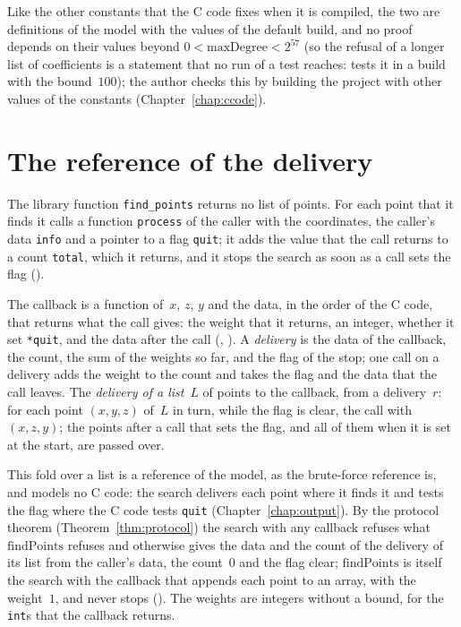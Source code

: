 Like the other constants that the C code fixes when it is compiled, the two are definitions of the
model with the values of the default build, and no proof depends on their values beyond
$0 < \mathrm{maxDegree} < 2^{57}$ (so the refusal of a longer list of coefficients is a statement
that no run of a test reaches: \ratpoints{} tests it in a build with the bound~$100$); the author
checks this by building the project with other values
of the constants (Chapter~\ref{chap:ccode}).

\section{The reference of the delivery}\label{sec:specDelivery}

The library function \verb|find_points| returns no list of points. For each point that it finds it
calls a function \verb|process| of the caller with the coordinates, the caller's data \verb|info|
and a pointer to a flag \verb|quit|; it adds the value that the call returns to a count
\verb|total|, which it returns, and it stops the search as soon as a call sets the flag
().

\begin{definition}\label{def:deliver}
  \leanok
  The callback is a function of~$x$, $z$, $y$ and the data, in the order of the C code, that returns
  what the call gives: the weight that it returns, an integer, whether it set \verb|*quit|, and the
  data after the call (, ). A
  \emph{delivery} is the data of the callback, the count, the sum of the weights so far, and the
  flag of the stop; one call on a delivery adds the weight to the count and takes the flag and the
  data that the call leaves. The \emph{delivery of a list}~$L$ of points to the callback, from a
  delivery~$r$: for each point $(x, y, z)$ of~$L$ in turn, while the flag is clear, the call with
  $(x, z, y)$; the points after a call that sets the flag, and all of them when it is set at the
  start, are passed over.
\end{definition}

This fold over a list is a reference of the model, as the brute-force reference is, and models no C
code: the search delivers each point where it finds it and tests the flag where the C code tests
\verb|quit| (Chapter~\ref{chap:output}). By the protocol theorem (Theorem~\ref{thm:protocol}) the
search with any callback refuses what $\mathrm{findPoints}$ refuses and otherwise gives the data and
the count of the delivery of its list from the caller's data, the count~$0$ and the flag clear;
$\mathrm{findPoints}$ is itself the search with the callback that appends each point to an array,
with the weight~$1$, and never stops (). The weights are integers
without a bound, for the \verb|int|s that the callback returns.


